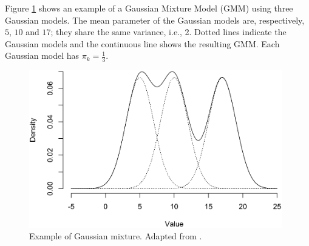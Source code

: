 





Figure \ref{example_mixture} shows an example of a Gaussian Mixture Model (GMM) using three Gaussian models. The mean parameter of the Gaussian models are, respectively, $5$, $10$ and $17$; they share the same variance, i.e., 2. Dotted lines indicate the Gaussian models and the continuous line shows the resulting GMM. Each Gaussian model has $\pi_k = \frac{1}{3}$. 

\begin{figure}[ht]
\centering
\includegraphics[width=11cm]{figures/gaussian_mixture.png}
\caption{Example of Gaussian mixture. Adapted from \cite{Smason79}.}
\label{example_mixture}
\end{figure}

